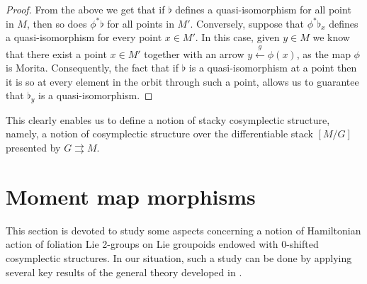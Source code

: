 \documentclass[
  a4paper, 
  reqno, 
  oneside, 
  12pt
]{amsart}
\theoremstyle{definition}
\theoremstyle{remark}
\newcommand{\rr}{\rightrightarrows}
\begin{document}
\begin{proof}
From the above we get that if $\flat$ defines a quasi-isomorphism for all point in $M$, then so does $\phi^*\flat$ for all points in $M'$. Conversely, suppose that $\phi^*\flat_x$ defines a quasi-isomorphism for every point $x \in M'$. In this case, given $y \in M$ we know that there exist a point $x \in M'$ together with an arrow $y \xleftarrow{\,g\,} \phi(x)$, as the map $\phi$ is Morita. Consequently, the fact that if $\flat$ is a quasi-isomorphism at a point then it is so at every element in the orbit through such a point, allows us to guarantee that $\flat_y$ is a quasi-isomorphism.
\end{proof}

This clearly enables us to define a notion of stacky cosymplectic structure, namely, a notion of cosymplectic structure over the differentiable stack $[M/G]$ presented by $G\rr M$.


\section{Moment map morphisms}



This section is devoted to study some aspects concerning a notion of Hamiltonian action of foliation Lie 2-groups on Lie groupoids endowed with 0-shifted cosymplectic structures. In our situation, such a study can be done by applying several key results of the general theory developed in \cite{HoffmanSjamaar}.
\end{document}
